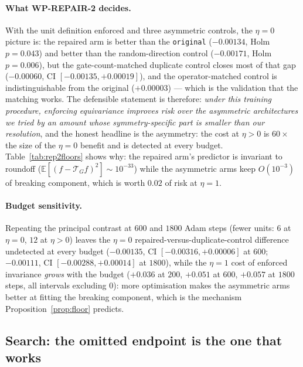 \documentclass[11pt]{article}
\newcommand{\Tg}{\mathcal{T}_G}
\begin{document}
\paragraph{What WP-REPAIR-2 decides.} With the unit definition enforced and three asymmetric
controls, the $\eta{=}0$ picture is: the repaired arm is better than the
\texttt{original} ($-0.00134$, Holm $p{=}0.043$) and better than the random-direction control
($-0.00171$, Holm $p{=}0.006$), but the gate-count-matched duplicate control closes most of
that gap ($-0.00060$, CI $[-0.00135,+0.00019]$), and the operator-matched control is
indistinguishable from the original ($+0.00003$) --- which is the validation that the
matching works. The defensible statement is therefore: \emph{under this training procedure,
enforcing equivariance improves risk over the asymmetric architectures we tried by an amount
whose symmetry-specific part is smaller than our resolution}, and the honest headline is the
asymmetry: the cost at $\eta{>}0$ is $60\times$ the size of the $\eta{=}0$ benefit and is
detected at every budget. Table~\ref{tab:rep2floors} shows why: the repaired arm's predictor
is invariant to roundoff ($\mathbb{E}[(f-\Tg f)^2]\sim10^{-33}$) while the asymmetric arms
keep $O(10^{-3})$ of breaking component, which is worth $0.02$ of risk at $\eta{=}1$.

\paragraph{Budget sensitivity.} Repeating the principal contrast at $600$ and $1800$
Adam steps (fewer units: $6$ at $\eta{=}0$, $12$ at $\eta{>}0$) leaves the $\eta{=}0$
repaired-versus-duplicate-control difference undetected at every budget
($-0.00135$, CI $[-0.00316,+0.00006]$ at $600$; $-0.00111$, CI $[-0.00288,+0.00014]$ at
$1800$), while the $\eta{=}1$ cost of enforced invariance \emph{grows} with the budget
($+0.036$ at $200$, $+0.051$ at $600$, $+0.057$ at $1800$ steps, all intervals excluding
$0$): more optimisation makes the asymmetric arms better at fitting the breaking component,
which is the mechanism Proposition~\ref{prop:floor} predicts.

\subsection{Search: the omitted endpoint is the one that works}
\label{sec:search-results}
\end{document}
